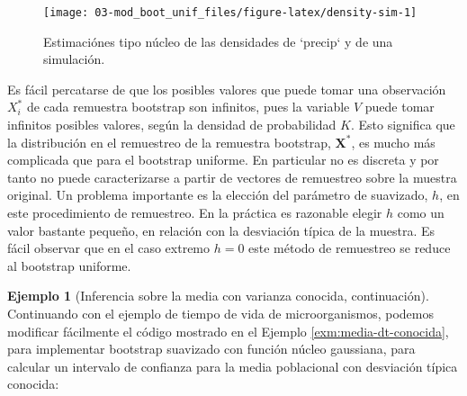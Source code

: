 \documentclass[
]{book}
\theoremstyle{break}
\theoremstyle{definition}
\theoremstyle{definition}
\newtheorem{example}{Ejemplo}[chapter]
\theoremstyle{definition}
\theoremstyle{definition}
\theoremstyle{remark}
\begin{document}
\begin{figure}[!htb]

{\centering \texttt{[image: 03-mod\_boot\_unif\_files/figure-latex/density-sim-1]} 

}

\caption{Estimaciónes tipo núcleo de las densidades de `precip` y de una simulación.}\label{fig:density-sim}
\end{figure}

Es fácil percatarse de que los posibles valores que puede tomar una
observación \(X_i^{\ast}\) de cada remuestra bootstrap son infinitos,
pues la variable \(V\) puede tomar infinitos posibles valores, según la
densidad de probabilidad \(K\). Esto significa que la distribución en el
remuestreo de la remuestra bootstrap, \(\mathbf{X}^{\ast}\), es
mucho más complicada que para el bootstrap uniforme. En particular no es
discreta y por tanto no puede caracterizarse a partir de vectores de
remuestreo sobre la muestra original. Un problema importante es la
elección del parámetro de suavizado, \(h\), en este procedimiento de
remuestreo. En la práctica es razonable elegir \(h\) como un valor
bastante pequeño, en relación con la desviación típica de la muestra. Es
fácil observar que en el caso extremo \(h=0\) este método de remuestreo se
reduce al bootstrap uniforme.

\begin{example}[Inferencia sobre la media con varianza conocida, continuación]
\protect\hypertarget{exm:media-dt-conocida-suav}{}{\label{exm:media-dt-conocida-suav} \iffalse (Inferencia sobre la media con varianza conocida, continuación) \fi{} }
Continuando con el ejemplo de tiempo de vida de microorganismos,
podemos modificar fácilmente el código mostrado en el Ejemplo \ref{exm:media-dt-conocida}, para implementar bootstrap suavizado
con función núcleo gaussiana, para calcular un intervalo de confianza
para la media poblacional con desviación típica conocida:
\end{example}
\end{document}
